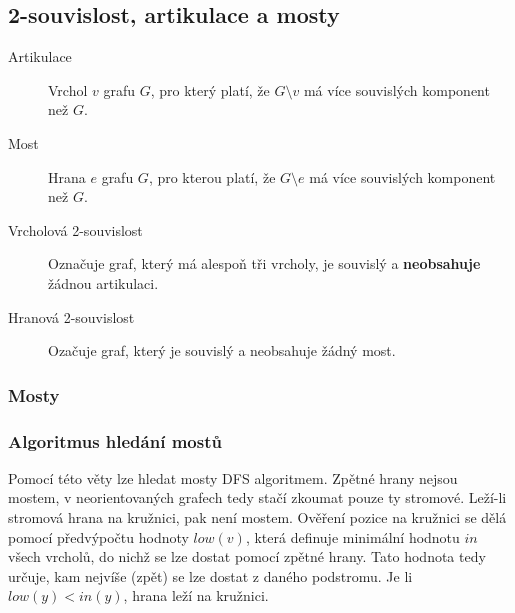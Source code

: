 \subsection{2-souvislost, artikulace a mosty}

\begin{description}
    \item[Artikulace] Vrchol $v$ grafu $G$, pro který platí, že $G \setminus v$ má více souvislých komponent než $G$.
    \item[Most] Hrana $e$ grafu $G$, pro kterou platí, že $G \setminus e$ má více souvislých komponent než $G$.
    \item[Vrcholová 2-souvislost] Označuje graf, který má alespoň tři vrcholy, je souvislý a \textbf{neobsahuje} žádnou artikulaci.
    \item[Hranová 2-souvislost] Ozačuje graf, který je souvislý a neobsahuje žádný most.
\end{description}

\subsubsection{Mosty}


\subsubsection{Algoritmus hledání mostů}\label{alg:hledani-mostu}

Pomocí této věty lze hledat mosty DFS algoritmem.
Zpětné hrany nejsou mostem, v neorientovaných grafech tedy stačí zkoumat pouze ty stromové.
Leží-li stromová hrana na kružnici, pak není mostem.
Ověření pozice na kružnici se dělá pomocí předvýpočtu hodnoty $low(v)$, která definuje minimální hodnotu $in$ všech vrcholů, do nichž se lze dostat pomocí zpětné hrany.
Tato hodnota tedy určuje, kam nejvíše (zpět) se lze dostat z daného podstromu.
Je li $low(y) < in(y)$, hrana leží na kružnici.